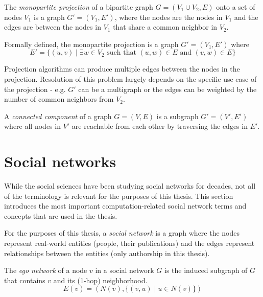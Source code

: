 \begin{definition}\label{def:monopartite-projection}
    The \textit{monopartite projection} of a bipartite graph $G = (V_1 \cup V_2, E)$ onto a set of nodes $V_1$ is a graph $G' = (V_1, E')$, 
    where the nodes are the nodes in $V_1$ and the edges are between the nodes in $V_1$ that share a common neighbor in $V_2$.
    
    Formally defined, the monopartite projection is a graph $G' = (V_1, E')$ where
    $$
    E' = \{ (u, v) \mid \exists w \in V_2 \text{ such that } (u, w) \in E \text{ and } (v, w) \in E \}
    $$

    Projection algorithms can produce multiple edges between the nodes in the projection.
    Resolution of this problem largely depends on the specific use case of the projection - e.g. $G'$ can be a multigraph or the edges can be weighted by the number of common neighbors from $V_2$.
    
\begin{definition}
    A \textit{connected component} of a graph $G = (V, E)$ is a subgraph $G' = (V', E')$ where all nodes in $V'$ are reachable from each other by traversing the edges in $E'$.
\end{definition}

\end{definition}
\section{Social networks}

While the social sciences have been studying social networks for decades, not all of the terminology is relevant for the purposes of this thesis.
This section introduces the most important computation-related social network terms and concepts that are used in the thesis.

For the purposes of this thesis, a \textit{social network} is a graph where the nodes represent real-world entities (people, their publications) and the edges represent relationships between the entities (only authorship in this thesis).

\begin{definition}
    The \textit{ego network} of a node $v$ in a social network $G$ is the induced subgraph of $G$ that contains $v$ and its (1-hop) neighborhood.
    $$
    E(v) = (N(v), \{ (v, u) \mid u \in N(v) \})
    $$
\end{definition}

